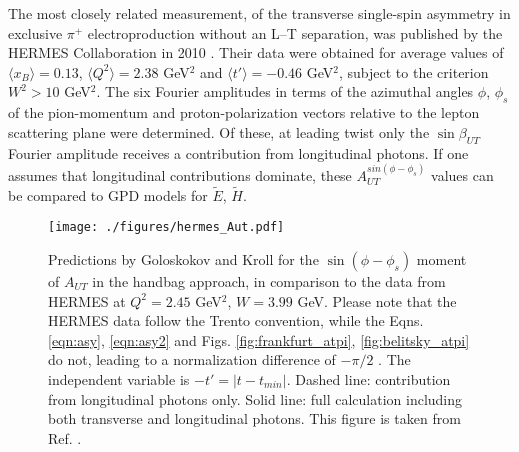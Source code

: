 The most closely related measurement, of the transverse single-spin asymmetry
in exclusive $\pi^+$ electroproduction without an L--T separation, was
published by the HERMES Collaboration in 2010 \cite{hermes10}.  Their data were
obtained for average values of $\langle x_B \rangle =0.13$, $\langle Q^2 \rangle
=2.38$ GeV$^2$ and $\langle t' \rangle = -0.46$ GeV$^2$, subject to the
criterion $W^2>10$ GeV$^2$.  The six Fourier amplitudes in terms of the
azimuthal angles $\phi$, $\phi_s$ of the pion-momentum and proton-polarization
vectors relative to the lepton scattering plane were determined.  Of these, at
leading twist only the $\sin\beta_{UT}$ Fourier amplitude receives a
contribution from longitudinal photons.  If one assumes that longitudinal
contributions dominate, these $A_{UT}^{sin(\phi-\phi_s)}$ values can be
compared to GPD models for $\tilde{E}$, $\tilde{H}$.

\begin{figure}[hbt!]
\begin{center}
\texttt{[image: ./figures/hermes\_Aut.pdf]}
\end{center}
\caption{\label{fig:hermes_aut}
\footnotesize{
Predictions by Goloskokov and Kroll for the $\sin(\phi-\phi_s)$ moment of
$A_{UT}$ in the handbag approach, in comparison to the data from HERMES at
$Q^2=2.45$ GeV$^2$, $W=3.99$ GeV.  Please note that the HERMES data
follow the Trento convention, while the Eqns. \ref{eqn:asy}, \ref{eqn:asy2} and
Figs. \ref{fig:frankfurt_atpi}, \ref{fig:belitsky_atpi} do not, leading to a
normalization difference of $-\pi/2$ \cite{hermes-thesis}.  The independent
variable is $-t'=|t-t_{min}|$.  Dashed line: contribution from longitudinal
photons only.  Solid line: full calculation including both transverse and
longitudinal photons.  This figure is taken from Ref. .}}
\end{figure}

